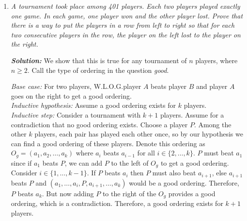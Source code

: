 \documentclass[11pt]{article}
\newcommand{\sol}[0]{\textbf{\textit{Solution: }}}
\begin{document}
\begin{enumerate}
\sol Suppose \((p, q)\) and \(a\) are as in the question. We have
\[a^{2} - pq = p^{2} + 4pq + 4q^{2} = (p + 2q)^{2},\]
so
\[pq = a^{2} - (p + 2q)^{2} = (a - p - 2q)(a + p + 2q).\]
Since \(pq\) is positive and \(a + p + 2q\) is positive, so is \(a - p - 2q\). Now \(a + p + 2q > p\) and \(a + p + 2q > q\), but \(p\) and \(q\) are prime, so \(a + p + 2q = pq\) and \(a - p - 2q = 1\), so \(a = p + 2q + 1\) and \((p + 2q + 1) + p + 2q = pq\), so \(2p + 4q + 1 = pq\), so
\[9 = pq - 2p - 4q + 8 = (p - 4)(q - 2).\]
Therefore, \((p - 4, q - 2)\) is among
\((-9, -1), (-3, -3), (-1, -9), (1, 9), (3, 3), (9, 1).\)
It follows that \((p, q)\) is among
\((-5, 1), (1, -1), (3, -7), (5, 11), (7, 5), (13, 3).\)
Since \(p\) and \(q\) are positive and prime, we find that
\[(p, q) = (5, 11) \text{ or } (p, q) = (7, 5) \text{ or } (p, q) = (13, 3).\]
Those three pairs are the solutions, because
\[\begin{aligned}
5^{2} + 5(5)(11) + 4(11)^{2} & = 784 = 28^{2},\\
7^{2} + 5(7)(5) + 4(5)^{2} & = 324 = 18^{2}\textrm{, and}\\
13^{2} + 5(13)(3) + 4(3)^{2} & = 400 = 20^{2}.
\end{aligned}\]
This completes the proof. $\hfill\blacksquare$


\item \textit{A tournament took place among 401 players. Each two players played exactly one game. In each game, one player won and the other player lost. Prove that there is a way to put the players in a row from left to right so that for each two consecutive players in the row, the player on the left lost to the player on the right.}

\sol We show that this is true for any tournament of $n$ players, where $n \geqslant 2$. Call the type of ordering in the question \emph{good}.

\textit{Base case:} For two players, W.L.O.G.\@ player $A$ beats player $B$ and player $A$ goes on the right to get a good ordering.\\
\textit{Inductive hypothesis:} Assume a good ordering exists for $k$ players.\\
\textit{Inductive step:} Consider a tournament with $k+1$ players. Assume for a contradiction that no good ordering exists. Choose a player $P$. Among the other $k$ players, each pair has played each other once, so by our hypothesis we can find a good ordering of these players. Denote this ordering as $O_g = (a_1, a_2, \ldots, a_k)$ where $a_i$ beats $a_{i-1}$ for all $i \in \{2, \ldots, k\}$. $P$ must beat $a_1$ since if $a_1$ beats $P$, we can add $P$ to the left of $O_g$ to get a good ordering. Consider $i \in \{1, \ldots, k-1\}$. If $P$ beats $a_i$ then $P$ must also beat $a_{i+1}$, else $a_{i+1}$ beats $P$ and $(a_1, \ldots, a_i, P, a_{i+1}, \ldots, a_k)$ would be a good ordering. Therefore, $P$ beats $a_k$. But now adding $P$ to the right of the $O_g$ provides a good ordering, which is a contradiction. Therefore, a good ordering exists for $k+1$ players.


\end{enumerate}
\end{document}
